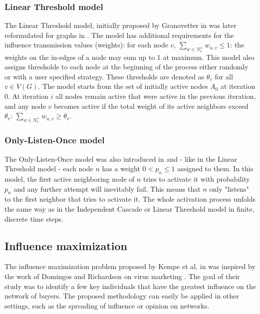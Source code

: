 \documentclass[pdflatex,sn-mathphys-ay]{sn-jnl}
\begin{document}

\subsubsection{Linear Threshold model}

The Linear Threshold model, initially proposed by Granovetter in \citep{granovetter} was later reformulated for graphs in \citep{kempe}. The model has additional requirements for the influence transmission values (weights): for each node $v$, $\sum_{w \in N^+_v} w_{u,v} \leq 1$: the weights on the in-edges of a node may sum up to 1 at maximum. This model also assigns thresholds to each node at the beginning of the process either randomly or with a user specified strategy. These thresholds are denoted as $\theta_v$ for all $v \in V(G)$. The model starts from the set of initially active nodes $A_0$ at iteration $0$. At iteration $i$ all nodes remain active that were active in the previous iteration, and any node $v$ becomes active if the total weight of its active neighbors exceed $\theta_v$: $\sum_{w \in N^+_v} w_{u,v} \geq \theta_v$.


\subsubsection{Only-Listen-Once model}

The Only-Listen-Once model was also introduced in \citep{kempe} and - like in the Linear Threshold model - each node $n$ has a weight $0 < p_{n} \leq 1$ assigned to them. In this model, the first active neighboring node of $n$ tries to activate it with probability $p_{n}$ and any further attempt will inevitably fail. This means that $n$ only "listens" to the first neighbor that tries to activate it. The whole activation process unfolds the same way as in the Independent Cascade or Linear Threshold model in finite, discrete time steps.


\subsection{Influence maximization}\label{subsec_infmax}

The influence maximization problem proposed by Kempe et al. in \citep{kempe} was inspired by the work of Domingos and Richardson on virus marketing \citep{domingos}. The goal of their study was to identify a few key individuals that have the greatest influence on the network of buyers. The proposed methodology can easily be applied in other settings, such as the spreading of influence or opinion on networks.
\end{document}
